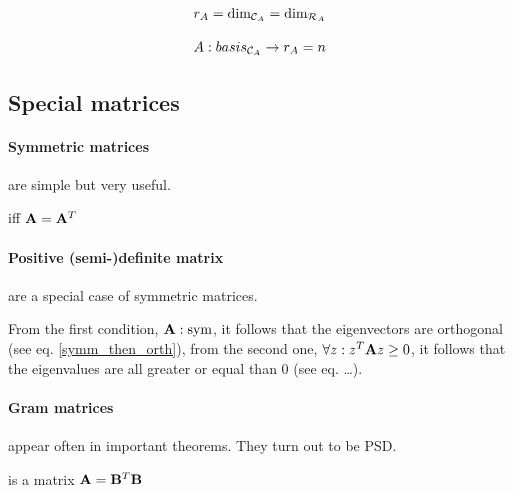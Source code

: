 \begin{theorem}
    $$ r_A = \text{dim}_{\mathcal{C}_{A}} = \text{dim}_{\mathcal{R}_{A}} $$
\end{theorem}

\begin{theorem}
    $$ A:basis_{\mathcal{C}_{A}} \to r_A = n $$
\end{theorem}






\subsection{Special matrices}

\paragraph{Symmetric matrices} are simple but very useful.
\begin{definition}
     iff $\mathbf{A} = \mathbf{A}^T$
\end{definition}


\paragraph{Positive (semi-)definite matrix} are a special case of symmetric matrices.
\begin{definition}
    From the first condition, $\mathbf{A}: \text{sym}$, it follows that the eigenvectors are orthogonal (see eq. \ref{symm_then_orth}), 
    from the second one, $\forall z: z^T \mathbf{A} z \geq 0$, it follows that the eigenvalues are all greater or equal than $0$ (see eq. \dots).
\end{definition}


\paragraph{Gram matrices} appear often in important theorems. They turn out to be PSD.
\begin{definition}
     is a matrix $\mathbf{A} = \mathbf{B}^T \mathbf{B}$
\end{definition}

\begin{theorem}
    [$\rank{A} = \rank{A^T A}$]
\end{theorem}

\begin{theorem}
    [$A^T A: \PSD$]
\end{theorem}


